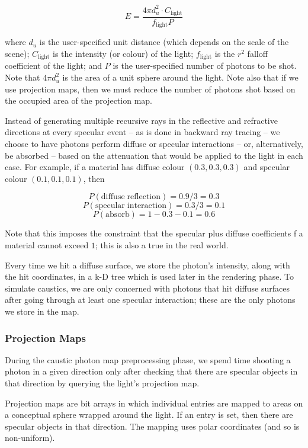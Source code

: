 \documentclass{article}
\newcommand{\mrm}[1]{\mathrm{#1}}
\begin{document}
$$E = \frac{4 \pi d_u^2 \cdot C_{\mrm{light}}}{f_{\mrm{light}}P}$$

where $d_u$ is the user-specified unit distance (which depends on the scale of the scene); $C_{\mrm{light}}$ is the intensity (or colour) of the light; $f_{\mrm{light}}$ is the $r^2$ falloff coefficient of the light; and $P$ is the user-specified number of photons to be shot. Note that $4\pi d_u^2$ is the area of a unit sphere around the light. Note also that if we use projection maps, then we must reduce the number of photons shot based on the occupied area of the projection map.

Instead of generating multiple recursive rays in the reflective and refractive
directions at every specular event -- as is done in backward ray tracing
-- we choose to have photons perform diffuse or specular interactions -- or,
alternatively, be absorbed -- based on the
attenuation that would be applied to the light in each case. For example, if a
material has diffuse colour $(0.3, 0.3,
0.3)$ and specular colour $(0.1, 0.1, 0.1)$, then

$$P(\mrm{diffuse\; reflection}) = 0.9 / 3 = 0.3$$
$$P(\mrm{specular\; interaction}) = 0.3 / 3 = 0.1$$
$$P(\mrm{absorb}) = 1 - 0.3 - 0.1 = 0.6$$

Note that this imposes the constraint that the specular plus diffuse coefficients
f a material cannot exceed $1$; this is also a true in the real world.

Every time we hit a diffuse surface, we store the photon's intensity, along with
the hit coordinates, in a k-D tree which is used later in the rendering phase.
To simulate caustics, we are only concerned with photons that hit diffuse
surfaces after going through at least one specular interaction; these are the
only photons we store in the map.

\subsubsection{Projection Maps}

During the caustic photon map preprocessing phase, we spend time shooting a
photon in a given direction only after checking that there are specular objects
in that direction by querying the light's projection map.

Projection maps are bit arrays in which individual entries are mapped to areas on
a conceptual sphere wrapped around the light. If an entry is set, then there are
specular objects in that direction. The mapping uses polar coordinates (and so
is non-uniform).
\end{document}
